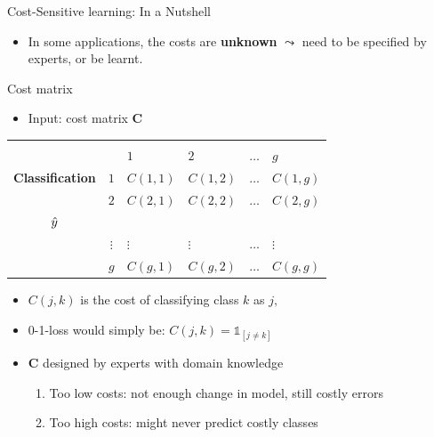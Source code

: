 \documentclass[11pt,compress,t,notes=noshow, xcolor=table]{beamer}
\begin{document}
\begin{frame}{Cost-Sensitive learning: In a Nutshell}
{\begin{minipage}{0.49\textwidth}
\begin{itemize}
                \item In some applications, the costs are \textbf{unknown} $\leadsto$ need to be specified by experts, or be learnt.
            \end{itemize}   
        \end{minipage}
		
	}
\end{frame}

\begin{frame}{Cost matrix}
%	
%	
	\begin{itemize}
%		
		\item Input: cost matrix $\mathbf{C}$ 
	\end{itemize}
	\begin{center}
		\tiny
		\begin{tabular}{cc|>{\centering\arraybackslash}p{8em}>{\centering\arraybackslash}p{8em}>{\centering\arraybackslash}p{5em}>{\centering\arraybackslash}p{8em}}
			& & \multicolumn{4}{c}{\bfseries True Class $y$} \\
			&  & $1$ & $2$ & $\ldots$ & $g$  \\
			\hline
			\bfseries Classification     & $1$ & $C(1,1)$  &  $C(1,2)$  & $\ldots$ &  $C(1,g)$ \\
			& $2$ &  $C(2,1)$  &  $C(2,2)$  & $\ldots$ & $C(2,g)$  \\
            $\hat{y}$ & & & & & \\
			& $\vdots$ & $\vdots$ & $\vdots$ & $\ldots$ & $\vdots$ \\
			& $g$ & $C(g,1)$ & $C(g,2)$  & $\ldots$ &  $C(g,g)$\\
		\end{tabular}
	\end{center}
	\begin{itemize}
		\item $C(j,k)$ is the cost of classifying class $k$ as $j,$ 
  \item 0-1-loss would simply be: $C(j,k) = \mathds{1}_{[ j \neq k ]}$
		
		\item $\mathbf{C}$ designed by experts with domain knowledge
		\begin{enumerate}
            \item Too low costs: not enough change in model, still costly errors
            \item Too high costs: might never predict costly classes
		\end{enumerate}
		
	\end{itemize}


\end{frame}
\end{document}
